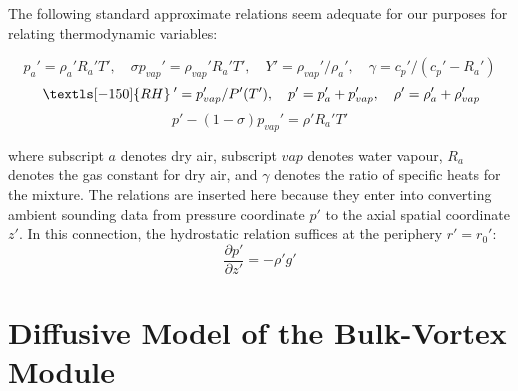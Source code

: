 \documentclass[preprint, prX]{revtex4}
\newcommand{\pd}[2]{\frac{\partial#1}{\partial#2}}
\newcommand{\rh}{\:\textls[-150]{RH}\:}
\begin{document}
The following standard approximate relations seem adequate for our purposes for relating thermodynamic variables:

\begin{equation}
p_a' = \rho_a' R_a'T', \quad \sigma p_{vap}'=\rho_{vap}'R_a' T', \quad Y' = \rho_{vap}'/\rho_a', \quad \gamma = c_p'/(c_p'-R_a')
\end{equation}
\begin{equation}
\rh'=p_{vap}'/P'(T'), \quad p'=p_a'+p_{vap}', \quad \rho' = \rho_a' + \rho_{vap}'
\end{equation}
\begin{equation}
p'-(1-\sigma)p_{vap}' = \rho' R_a'T'
\end{equation}

where subscript $a$ denotes dry air, subscript $vap$ denotes water vapour, $R_a$ denotes the gas constant for dry air, and $\gamma$ denotes the ratio of specific heats for the mixture. The relations are inserted here because they enter into converting ambient sounding data from pressure coordinate $p'$ to the axial spatial coordinate $z'$. In this connection, the hydrostatic relation suffices at the periphery $r' = r_0'$:
\begin{equation}
\pd{p'}{z'} = -\rho' g'
\end{equation}

\section{Diffusive Model of the Bulk-Vortex Module}

\begin{figure}[h!]
	\centering
	\def\svgwidth{0.7\columnwidth}
	
\end{figure}
\end{document}
